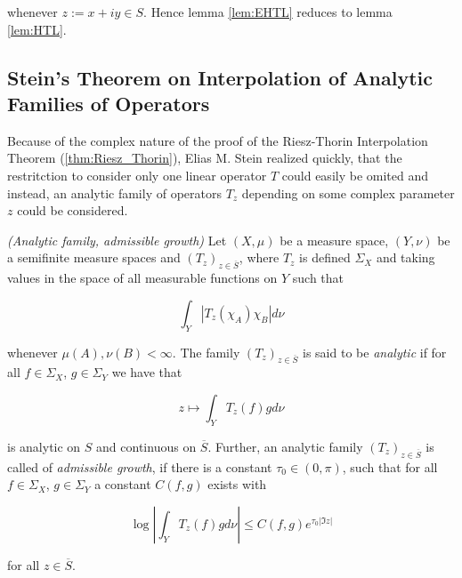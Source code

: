 \begin{remark}
	\noindent whenever $z := x + iy \in S$. Hence lemma \ref{lem:EHTL} reduces to lemma \ref{lem:HTL}.
\end{remark}

\subsection{Stein's Theorem on Interpolation of Analytic Families of Operators}
Because of the complex nature of the proof of the Riesz-Thorin Interpolation Theorem (\ref{thm:Riesz_Thorin}), Elias M. Stein realized quickly, that the restritction to consider only one linear operator $T$ could easily be omited and instead, an analytic family of operators $T_z$ depending on some complex parameter $z$ could be considered.

\vspace{2mm}

\begin{mdframed}
	\begin{definition}\emph{(Analytic family, admissible growth)}
		Let $(X,\mu)$ be a measure space, $(Y,\nu)$ be a semifinite measure spaces and $\left( T_z \right)_{z \in \overline{S}}$, where $T_z$ is defined $\Sigma_X$ and taking values in the space of all measurable functions on $Y$ such that

		\begin{equation}
			\int_Y \left| T_z(\chi_A)\chi_B \right| d\nu
		\end{equation}

		whenever $\mu(A),\nu(B) < \infty$. The family $\left( T_z \right)_{z \in \overline{S}}$ is said to be \emph{analytic} if for all $f \in \Sigma_X$, $g \in \Sigma_Y$ we have that

		\begin{equation}
			z \mapsto \int_Y T_z(f)gd\nu
		\end{equation}

		is analytic on $S$ and continuous on $\overline{S}$. Further, an analytic family $\left( T_z \right)_{z \in \overline{S}}$ is called of \emph{admissible growth}, if there is a constant $\tau_0 \in (0,\pi)$, such that for all $f \in \Sigma_X$, $g \in \Sigma_Y$ a constant $C(f,g)$ exists with

			\begin{equation}
				\log\left| \int_Y T_z(f) g d\nu\right| \leq C(f,g)e^{\tau_0\left| \Im z\right|}
			\end{equation}

			for all $z \in \overline{S}$.
	\end{definition}
\end{mdframed}


